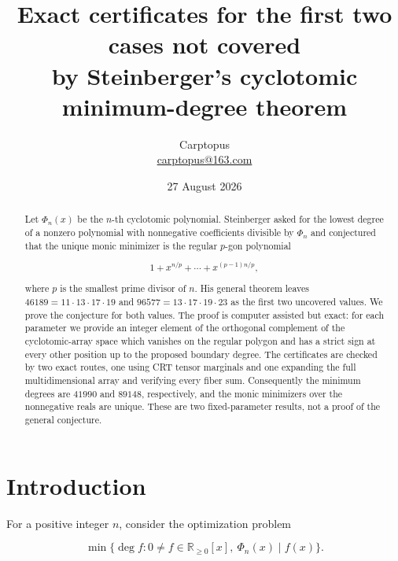 \documentclass[11pt]{article}
\title{Exact certificates for the first two cases not covered\\
by Steinberger's cyclotomic minimum-degree theorem}
\author{Carptopus\\\href{mailto:carptopus@163.com}{carptopus@163.com}}
\date{27 August 2026}
\numberwithin{equation}{section}
\begin{document}
\maketitle

\begin{center}
\end{center}

\begin{abstract}


Let $\Phi_n(x)$ be the $n$-th cyclotomic polynomial. Steinberger asked for the
lowest degree of a nonzero polynomial with nonnegative coefficients divisible
by $\Phi_n$ and conjectured that the unique monic minimizer is the regular
$p$-gon polynomial

\nopagebreak[4]
\[
1+x^{n/p}+\cdots+x^{(p-1)n/p},
\]

where $p$ is the smallest prime divisor of $n$. His general theorem leaves
$46189=11\cdot13\cdot17\cdot19$ and
$96577=13\cdot17\cdot19\cdot23$ as the first two uncovered values. We prove
the conjecture for both values. The proof is computer assisted but exact: for
each parameter we provide an integer element of the orthogonal complement of
the cyclotomic-array space which vanishes on the regular polygon and has a
strict sign at every other position up to the proposed boundary degree. The
certificates are checked by two exact routes, one using CRT tensor marginals
and one expanding the full multidimensional array and verifying every fiber
sum. Consequently the minimum degrees are $41990$ and $89148$, respectively,
and the monic minimizers over the nonnegative reals are unique. These are two
fixed-parameter results, not a proof of the general conjecture.

\end{abstract}

\section{Introduction}


For a positive integer $n$, consider the optimization problem

\nopagebreak[4]
\[
\min\{\deg f:0\ne f\in\mathbb R_{\geq0}[x],\ \Phi_n(x)\mid f(x)\}.
\tag{1.1}
\]
\end{document}
